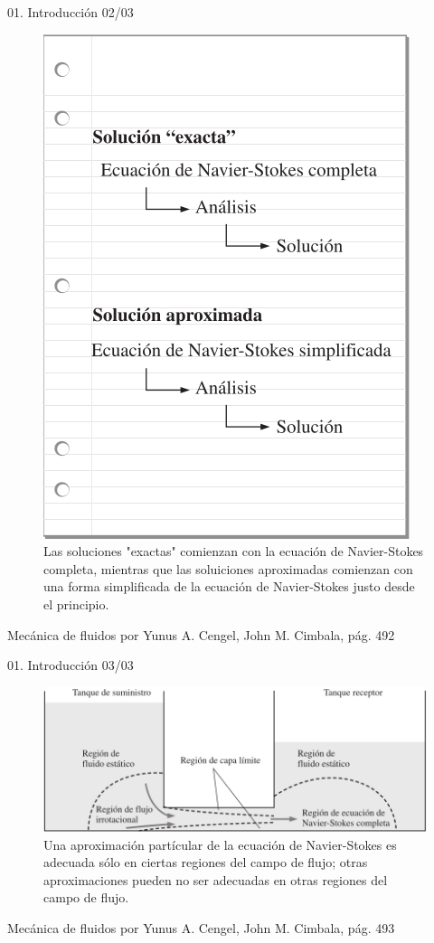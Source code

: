 \begin{frame}{01. Introducción 02/03}
\justifying
\begin{figure}[H]
\centering
\includegraphics[scale=0.2]{Section_Files/S3-imagenes-Jhon/0002.png}
\caption{Las soluciones "exactas" comienzan con la ecuación de Navier-Stokes completa, mientras que las soluiciones aproximadas comienzan con una forma simplificada de la ecuación de Navier-Stokes justo desde el principio.}
\end{figure}

{\tiny Mecánica de fluidos por Yunus A. Cengel, John M. Cimbala, pág. 492}
\end{frame}

\begin{frame}{01. Introducción 03/03}
\justifying
\begin{figure}[H]
\centering
\includegraphics[scale=0.2]{Section_Files/S3-imagenes-Jhon/0003.png}
\caption{Una aproximación partícular de la ecuación de Navier-Stokes es adecuada sólo en ciertas regiones del campo de flujo; otras aproximaciones pueden no ser adecuadas en otras regiones del campo de flujo.}
\end{figure}

{\tiny Mecánica de fluidos por Yunus A. Cengel, John M. Cimbala, pág. 493}
\end{frame}


